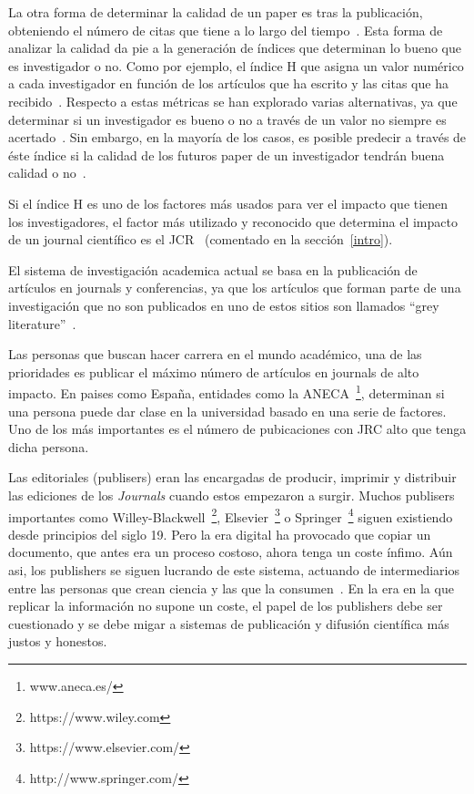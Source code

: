 La otra forma de determinar la calidad de un paper es tras la publicación,
obteniendo el número de citas que tiene a lo largo del
tiempo~\cite{redner1998popular}. Esta forma de analizar la calidad da pie a la
generación de índices que determinan lo bueno que es investigador o no. Como por
ejemplo, el índice H que asigna un valor numérico a cada investigador en función
de los artículos que ha escrito y las citas que ha
recibido~\cite{bornmann2007we}. Respecto a estas métricas se han explorado
varias alternativas, ya que determinar si un investigador es bueno o no a través
de un valor no siempre es acertado~\cite{bornmann2008there}. Sin embargo, en la
mayoría de los casos, es posible predecir a través de éste índice si la calidad
de los futuros paper de un investigador tendrán buena calidad o
no~\cite{hirsch2007does}.

Si el índice H es uno de los factores más usados para ver el impacto que tienen
los investigadores, el factor más utilizado y reconocido que determina el
impacto de un journal científico es el JCR~\cite{doi:10.1001/jama.295.1.90}
(comentado en la sección~\ref{intro}).

El sistema de investigación academica actual se basa en la publicación de
artículos en journals y conferencias, ya que los artículos que forman parte de
una investigación que no son publicados en uno de estos sitios son llamados
``grey literature''~\cite{rothstein2009grey}.

Las personas que buscan hacer carrera en el mundo académico, una de las
prioridades es publicar el máximo número de artículos en journals de alto
impacto. En paises como España, entidades como la
ANECA~\footnote{www.aneca.es/}, determinan si una persona puede dar clase en la
universidad basado en una serie de factores. Uno de los más importantes es el
número de pubicaciones con JRC alto que tenga dicha persona.

Las editoriales (publisers) eran las encargadas de producir, imprimir y
distribuir las ediciones de los \emph{Journals} cuando estos empezaron a surgir.
Muchos publisers importantes como
Willey-Blackwell~\footnote{https://www.wiley.com},
Elsevier~\footnote{https://www.elsevier.com/} o
Springer~\footnote{http://www.springer.com/} siguen existiendo desde principios
del siglo 19. Pero la era digital ha provocado que copiar un documento, que
antes era un proceso costoso, ahora tenga un coste ínfimo. Aún asi, los
publishers se siguen lucrando de este sistema, actuando de intermediarios entre
las personas que crean ciencia y las que la
consumen~\cite{lariviere2015oligopoly}. En la era en la que replicar la
información no supone un coste, el papel de los publishers debe ser cuestionado
y se debe migar a sistemas de publicación y difusión científica más justos y
honestos.

